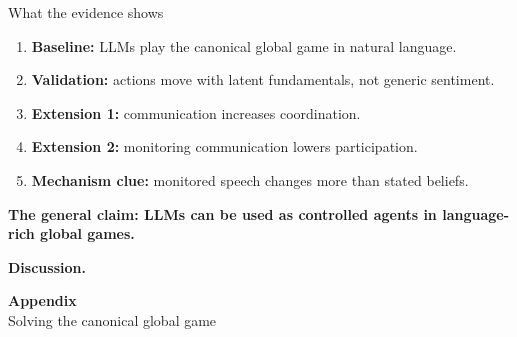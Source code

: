 \documentclass[aspectratio=169,12pt]{beamer}
\begin{document}
\begin{frame}{What the evidence shows}
  \begin{enumerate}\setlength\itemsep{0.5em}
    \item \textbf{Baseline:} LLMs play the canonical global game in natural language.
    \item \textbf{Validation:} actions move with latent fundamentals, not generic sentiment.
    \item \textbf{Extension 1:} communication increases coordination.
    \item \textbf{Extension 2:} monitoring communication lowers participation.
    \item \textbf{Mechanism clue:} monitored speech changes more than stated beliefs.
  \end{enumerate}

  \medskip
  \centering\large\color{accent}\textbf{The general claim: LLMs can be used as controlled agents in language-rich global games.}
\end{frame}

\begin{frame}[plain]
  \centering
  \vspace{1.2cm}
  {\Huge\color{purple}\textbf{Discussion.}}
\end{frame}

\appendix

\begin{frame}[plain]
  \centering
  \vspace{1.2cm}
  {\Huge\color{purple}\textbf{Appendix}}\\[0.8em]
  {\Large\color{muted}Solving the canonical global game}
\end{frame}
\end{document}
